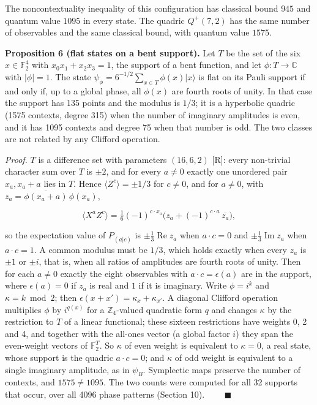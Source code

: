\documentclass[11pt,a4paper]{article}
\begin{document}
The noncontextuality inequality of this configuration has classical bound \(945\) and quantum value
\(1095\) in every state. The quadric \(Q^+(7,2)\) has the same number of observables and the same classical
bound, with quantum value \(1575\).

\textbf{Proposition 6 (flat states on a bent support).} Let \(T\) be the set of the six \(x \in \mathbb{F}_2^4\) with
\(x_0x_1 + x_2x_3 = 1\), the support of a bent function, and let \(\phi : T \to \mathbb{C}\) with \(|\phi| = 1\).
The state \(\psi_\phi = 6^{-1/2}\sum_{x \in T}\phi(x)|x\rangle\) is flat on its Pauli support if and only if, up
to a global phase, all \(\phi(x)\) are fourth roots of unity. In that case the support has 135 points and the
modulus is \(1/3\); it is a hyperbolic quadric (1575 contexts, degree 315) when the number of imaginary
amplitudes is even, and it has 1095 contexts and degree 75 when that number is odd. The two classes are
not related by any Clifford operation.

\emph{Proof.} \(T\) is a difference set with parameters \((16,6,2)\) {[}R{]}: every non-trivial character sum over \(T\)
is \(\pm 2\), and for every \(a \ne 0\) exactly one unordered pair \(x_a, x_a + a\) lies in \(T\). Hence
\(\langle Z^c\rangle = \pm 1/3\) for \(c \ne 0\), and for \(a \ne 0\), with \(z_a = \overline{\phi(x_a + a)}\,\phi(x_a)\),

\[\langle X^a Z^c \rangle = \tfrac16 (-1)^{c \cdot x_a}\big( z_a + (-1)^{c \cdot a}\, \overline{z_a} \big),\]

so the expectation value of \(P_{(a|c)}\) is \(\pm\tfrac13 \operatorname{Re} z_a\) when \(a \cdot c = 0\) and
\(\pm\tfrac13 \operatorname{Im} z_a\) when \(a \cdot c = 1\). A common modulus must be \(1/3\), which holds exactly
when every \(z_a\) is \(\pm 1\) or \(\pm i\), that is, when all ratios of amplitudes are fourth roots of unity.
Then for each \(a \ne 0\) exactly the eight observables with \(a \cdot c = \epsilon(a)\) are in the support,
where \(\epsilon(a) = 0\) if \(z_a\) is real and \(1\) if it is imaginary. Write \(\phi = i^{k}\) and
\(\kappa = k \bmod 2\); then \(\epsilon(x + x') = \kappa_x + \kappa_{x'}\). A diagonal Clifford operation
multiplies \(\phi\) by \(i^{q(x)}\) for a \(\mathbb{Z}_4\)-valued quadratic form \(q\) and changes \(\kappa\) by the
restriction to \(T\) of a linear functional; these sixteen restrictions have weights 0, 2 and 4, and
together with the all-ones vector (a global factor \(i\)) they span the even-weight vectors of
\(\mathbb{F}_2^{T}\). So \(\kappa\) of even weight is equivalent to \(\kappa = 0\), a real state, whose support is
the quadric \(a \cdot c = 0\); and \(\kappa\) of odd weight is equivalent to a single imaginary amplitude, as
in \(\psi_B\). Symplectic maps preserve the number of contexts, and \(1575 \ne 1095\). The two counts were
computed for all 32 supports that occur, over all 4096 phase patterns (Section 10). \(\qquad\blacksquare\)
\end{document}
